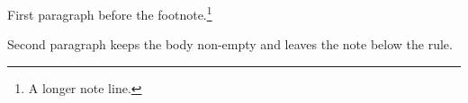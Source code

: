First paragraph before the footnote.\footnote*{A longer note line.}

Second paragraph keeps the body non-empty and leaves the note below the rule.\bye